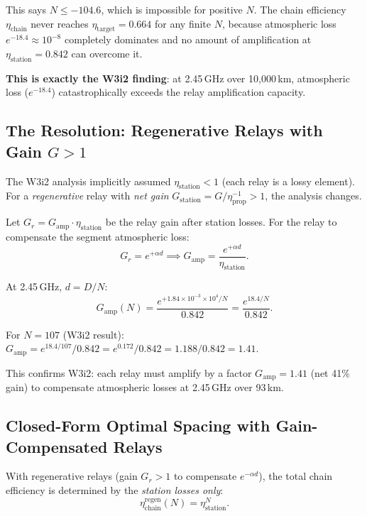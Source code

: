 \documentclass[aps,prd,twocolumn,superscriptaddress]{revtex4-2}
\begin{document}
This says $N \leq -104.6$, which is impossible for positive $N$.  The
chain efficiency $\eta_\mathrm{chain}$ never reaches $\eta_\mathrm{target} = 0.664$
for any finite $N$, because atmospheric loss $e^{-18.4} \approx 10^{-8}$
completely dominates and no amount of amplification at $\eta_\mathrm{station}
= 0.842$ can overcome it.

\textbf{This is exactly the W3i2 finding}: at 2.45\,GHz over 10,000\,km,
atmospheric loss ($e^{-18.4}$) catastrophically exceeds the relay
amplification capacity.

\subsection{The Resolution: Regenerative Relays with Gain $G > 1$}

The W3i2 analysis implicitly assumed $\eta_\mathrm{station} < 1$ (each
relay is a lossy element).  For a \emph{regenerative} relay with
\emph{net gain} $G_\mathrm{station} = G/\eta_\mathrm{prop}^{-1} > 1$,
the analysis changes.

Let $G_r = G_\mathrm{amp}\cdot\eta_\mathrm{station}$ be the relay
gain after station losses.  For the relay to compensate the segment
atmospheric loss:
\begin{equation}
G_r = e^{+\alpha d} \implies G_\mathrm{amp} = \frac{e^{+\alpha d}}{\eta_\mathrm{station}}.
\label{eq:G_relay}
\end{equation}

At 2.45\,GHz, $d = D/N$:
\begin{equation}
G_\mathrm{amp}(N) = \frac{e^{+1.84\times10^{-3}\times10^4/N}}{0.842}
= \frac{e^{18.4/N}}{0.842}.
\label{eq:G_amp_N}
\end{equation}

For $N = 107$ (W3i2 result): $G_\mathrm{amp} = e^{18.4/107}/0.842
= e^{0.172}/0.842 = 1.188/0.842 = 1.41$.

This confirms W3i2: each relay must amplify by a factor $G_\mathrm{amp} = 1.41$
(net 41\% gain) to compensate atmospheric losses at 2.45\,GHz over 93\,km.

\subsection{Closed-Form Optimal Spacing with Gain-Compensated Relays}

With regenerative relays (gain $G_r > 1$ to compensate $e^{-\alpha d}$),
the total chain efficiency is determined by the \emph{station losses only}:
\begin{equation}
\eta_\mathrm{chain}^\mathrm{regen}(N) = \eta_\mathrm{station}^N.
\label{eq:chain_regen}
\end{equation}
\end{document}
